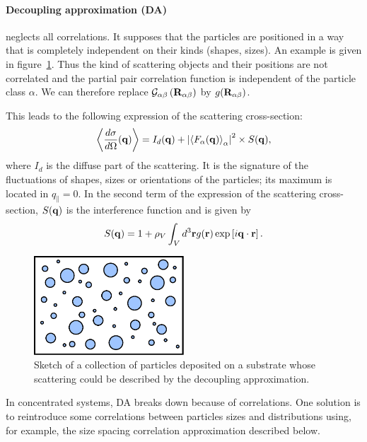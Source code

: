 \paragraph{Decoupling approximation (DA)}
neglects all correlations. It supposes that the particles are positioned in a way that is completely independent on their kinds (shapes, sizes). An example is given in figure~\ref{fig:da}. Thus the kind of scattering objects and their positions are not correlated and the partial pair correlation function is independent of the particle class $\alpha$. We can therefore replace $ \mathcal{G}_{\alpha \beta}\left( \mathbf{R}_{\alpha \beta} \right)$ by  $g(\mathbf{R}_{\alpha\beta})$.

This leads to the following expression of the scattering cross-section:
\begin{equation*}
\left\langle \frac{d\sigma}{d\Omega}(\mathbf{q}) \right\rangle  = I_d(\mathbf{q}) + \left\lvert \left\langle F_\alpha(\mathbf{q}) \right\rangle_\alpha \right\rvert ^2 \times S(\mathbf{q}),
\end{equation*}
where $I_d$ is the diffuse part of the scattering. It is the signature of the fluctuations of shapes, sizes or orientations of the particles; its maximum is located in $q_{\parallel}=0$. In the second term of the expression of the scattering cross-section, $S(\mathbf{q})$ is the interference function and is given by
\begin{equation*} 
  S(\mathbf{q}) = 1+ \rho_V \int_V d^3\mathbf{r} g(\mathbf{r}) \exp \left[ i\mathbf{q}\cdot \mathbf{r} \right].
\end{equation*}


\begin{figure}[ht]
\begin{center}
\includegraphics[width=0.5\textwidth]{fig/drawing/drawingDA.pdf}
\end{center}
\caption{Sketch of a collection of particles deposited on a substrate whose scattering  could be described by the decoupling approximation.}
\label{fig:da}
\end{figure}


In concentrated systems, DA breaks down because of correlations. One solution is to reintroduce some correlations between particles sizes and distributions using, for example, the size spacing correlation approximation described below. 

